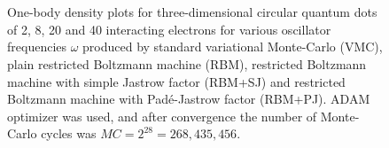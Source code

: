\begin{figure} [H]%
	\centering
	\\
	
	\\
	
	
	\caption{One-body density plots for three-dimensional circular quantum dots of 2, 8, 20 and 40 interacting electrons for various oscillator frequencies $\omega$ produced by standard variational Monte-Carlo (VMC), plain restricted Boltzmann machine (RBM), restricted Boltzmann machine with simple Jastrow factor (RBM+SJ) and restricted Boltzmann machine with Padé-Jastrow factor (RBM+PJ). ADAM optimizer was used, and after convergence the number of Monte-Carlo cycles was $MC=2^{28}=268,435,456$.}%
	\label{fig:OB_interaction_3D}
\end{figure}

